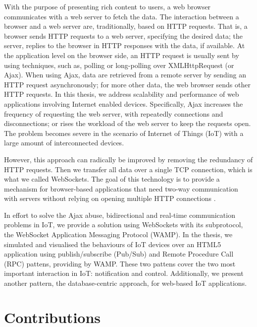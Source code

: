 With the purpose of presenting rich content to users, a web browser communicates with a web server to fetch the data. The interaction between a browser and a web server are, traditionally, based on HTTP requests. That is, a browser sends HTTP requests to a web server, specifying the desired data; the server, replies to the browser in HTTP responses with the data, if available. At the application level on the browser side, an HTTP request is usually sent by using techniques, such as, polling or long-polling over XMLHttpRequest (or Ajax). When using Ajax, data are retrieved from a remote server by sending an HTTP request asynchronously; for more other data, the web browser sends other HTTP requests. In this thesis, we address scalability and performance of web applications involving Internet enabled devices. Specifically, Ajax increases the frequency of requesting the web server, with repeatedly connections and disconnections; or rises the workload of the web server to keep the requests open. The problem becomes severe in the scenario of Internet of Things (IoT) with a large amount of interconnected devices.

However, this approach can radically be improved by removing the redundancy of HTTP requests. Then we transfer all data over a single TCP connection, which is what we called WebSockets. The goal of this technology is to provide a mechanism for browser-based applications that need two-way communication with servers without relying on opening multiple HTTP connections \cite{rfc64552012web}.

In effort to solve the Ajax abuse, bidirectional and real-time communication problems in IoT, we provide a solution using WebSockets with its subprotocol, the WebSocket Application Messaging Protocol (WAMP). In the thesis, we simulated and visualised the behaviours of IoT devices over an HTML5 application using publish/subscribe (Pub/Sub) and Remote Procedure Call (RPC) pattens, providing by WAMP. These two pattens cover the two most important interaction in IoT: notification and control. Additionally, we present another pattern, the database-centric approach, for web-based IoT applications. 

\section{Contributions}

